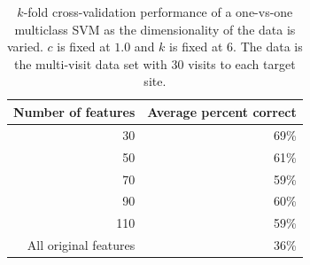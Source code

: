 \documentclass[10pt, twocolumn]{article}
\begin{document}
\begin{table}
\caption{$k$-fold cross-validation performance of a one-vs-one multiclass SVM as the dimensionality of 
the data is varied. $c$ is fixed at $1.0$ and $k$ is fixed at $6$. The data is the multi-visit data set 
with 30 visits to each target site.}
\begin{center}
\begin{tabular}{|r|r|}
\hline
Number of features & Average percent correct \\
\hline
30 & 69\% \\
\hline
50 & 61\% \\
\hline
70 & 59\% \\
\hline
90 & 60\% \\
\hline
110 & 59\% \\
\hline
All original features & 36\% \\ \hline
\end{tabular}
\end{center}
\label{tab:dimred-kfold}
\end{table}%
\end{document}
